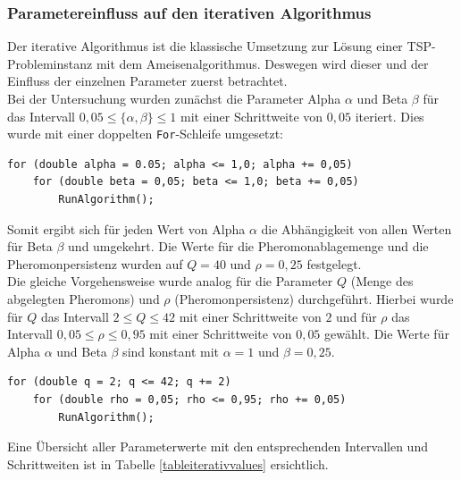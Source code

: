 \documentclass[doktyp=barbeit, sprache=german]{TUBAFarbeiten}
\begin{document}
\subsubsection{Parametereinfluss auf den iterativen Algorithmus}
Der iterative Algorithmus ist die klassische Umsetzung zur Lösung einer TSP-Probleminstanz mit dem Ameisenalgorithmus. Deswegen wird dieser und der Einfluss der einzelnen Parameter zuerst betrachtet. \\Bei der Untersuchung wurden zunächst die Parameter Alpha $\alpha$ und Beta $\beta$ für das Intervall $0,05 \leq \{\alpha,\beta\} \leq 1$ mit einer Schrittweite von $0,05$ iteriert. Dies wurde mit einer doppelten \texttt{For}-Schleife umgesetzt:
\begin{lstlisting}
for (double alpha = 0.05; alpha <= 1,0; alpha += 0,05)
	for (double beta = 0,05; beta <= 1,0; beta += 0,05) 
		RunAlgorithm();
\end{lstlisting}
Somit ergibt sich für jeden Wert von Alpha $\alpha$ die Abhängigkeit von allen Werten für Beta $\beta$ und umgekehrt. Die Werte für die Pheromonablagemenge und die Pheromonpersistenz wurden auf $Q = 40$ und $\rho = 0,25$ festgelegt.
\\Die gleiche Vorgehensweise wurde analog für die Parameter $Q$ (Menge des abgelegten Pheromons) und $\rho$ (Pheromonpersistenz) durchgeführt.
Hierbei wurde für $Q$ das Intervall $2 \leq Q \leq 42$ mit einer Schrittweite von $2$ und für $\rho$ das Intervall $0,05 \leq \rho \leq 0,95$ mit einer Schrittweite von $0,05$ gewählt. Die Werte für Alpha $\alpha$ und Beta $\beta$ sind konstant mit $\alpha = 1$ und $\beta = 0,25$. 
\begin{lstlisting}
for (double q = 2; q <= 42; q += 2)
	for (double rho = 0,05; rho <= 0,95; rho += 0,05) 
		RunAlgorithm();
\end{lstlisting}
Eine Übersicht aller Parameterwerte mit den entsprechenden Intervallen und Schrittweiten ist in Tabelle \ref{tableiterativvalues} ersichtlich.
\end{document}
